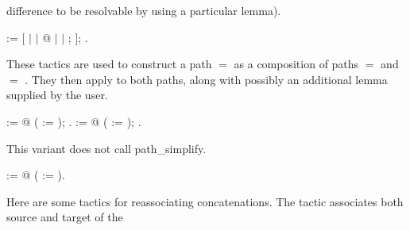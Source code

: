 \documentclass[12pt]{report}
\begin{document}
   difference to be resolvable by using a particular lemma). \begin{coqdoccode}
\coqdocemptyline
\coqdocnoindent
{}   :=\coqdoceol
\coqdocindent{1.00em}
   [\coqdoceol
\coqdocindent{3.00em}
 \coqdoceol
\coqdocindent{2.00em}
\ensuremath{|}  \coqdoceol
\coqdocindent{2.00em}
\ensuremath{|}  @\coqdoceol
\coqdocindent{2.00em}
\ensuremath{|}  \coqdoceol
\coqdocindent{2.00em}
\ensuremath{|}  ;  \coqdoceol
\coqdocindent{2.00em}
];   .\coqdoceol
\coqdocemptyline
\end{coqdoccode}
These tactics are used to construct a path  $=$  as a
   composition of paths  $=$  and  $=$ .  They then apply
    to both paths, along with possibly an additional
   lemma supplied by the user. \begin{coqdoccode}
\coqdocemptyline
\coqdocnoindent
{}   :=\coqdoceol
\coqdocindent{1.00em}
 @  ( := ); .\coqdoceol
\coqdocemptyline
\coqdocnoindent
{}    :=\coqdoceol
\coqdocindent{1.00em}
 @  ( := );  .\coqdoceol
\coqdocemptyline
\end{coqdoccode}
This variant does not call path\_simplify. \begin{coqdoccode}
\coqdocemptyline
\coqdocnoindent
{}   :=\coqdoceol
\coqdocindent{1.00em}
 @  ( := ).\coqdoceol
\coqdocemptyline
\end{coqdoccode}
Here are some tactics for reassociating concatenations.  The
   tactic  associates both source and target of the
\end{document}
